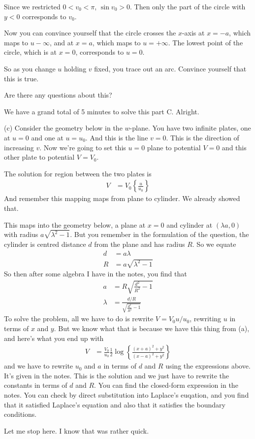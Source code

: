 Since we restricted $0< v_0 < \pi$,
$\sin v_0 > 0$.
Then only the part of the circle with $y<0$
corresponds to $v_0$.

Now you can convince yourself that the circle crosses the $x$-axis at
$x=-a$,
which maps to $u-\infty$,
and at $x=a$,
which maps to $u=+\infty$.
The lowest point of the circle,
which is at $x=0$,
corresponds to $u=0$.

So as you change $u$ holding $v$ fixed,
you trace out an arc.
Convince yourself that this is true.

Are there any questions about this?

We have a grand total of 5 minutes to solve this part C.
Alright.

(c) Consider the geometry below in the $w$-plane.
You have two infinite plates,
one at $u=0$ and one at $u=u_0$.
And this is the line $v=0$.
This is the direction of increasing $v$.
Now we're going to set this $u=0$ plane to potential
$V=0$
and this other plate to potential
$V=V_0$.

The solution for region between the two plates is
\begin{align}
    V &= V_0\left\{
        \frac{u}{u_0}
    \right\}
\end{align}
And remember this mapping maps from plane to cylinder.
We already showed that.

This maps into the geometry below,
a plane at $x=0$
and cylinder at $(\lambda a, 0)$
with radius $a\sqrt{\lambda^2 - 1}$.
But you remember in the formulation of the question,
the cylinder is centred distance $d$ from the plane
and has radius $R$.
So we equate
\begin{align}
    d &= a \lambda\\
    R &= a\sqrt{\lambda^2 - 1}
\end{align}
So then after some algebra I have in the notes,
you find that
\begin{align}
    a &=
    R \sqrt{\frac{d^2}{R^2} - 1}\\
    \lambda &=
    \frac{d/R}{\sqrt{\frac{d^2}{R^2} - 1}}
\end{align}
To solve the problem,
all we have to do is rewrite $V=V_0 u/u_0$,
rewriting $u$ in terms of $x$ and $y$.
But we know what that is because we have this thing from (a),
and here's what you end up with
\begin{align}
    V &= \frac{V_0}{u_0} \frac{1}{2}
    \log\left\{
        \frac{(x + a)^2 + y^2}{(x - a)^2 + y^2}
    \right\}
\end{align}
and we have to rewrite $u_0$ and $a$ in terms of
$d$ and $R$ using the expressions above.
It's given in the notes.
This is the solution
and we just have to rewrite the constants in terms of $d$ and $R$.
You can find the closed-form expression in the notes.
You can check by direct substitution into Laplace's euqation,
and you find that it satisfied Laplace's equation and also
that it satisfies the boundary conditions.

Let me stop here.
I know that was rather quick.
